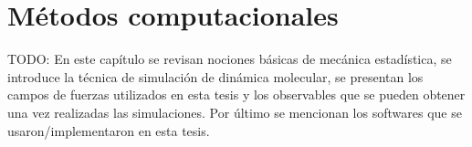 \chapter{Métodos computacionales}\label{ch:metodos}
\thispagestyle{empty}

\vspace{50pt}

\begin{adjustwidth}{50pt}{50pt}
    TODO: 
    En este capítulo se revisan nociones básicas de mecánica estadística, se 
    introduce la técnica de simulación de dinámica molecular, se presentan los 
    campos de fuerzas utilizados en esta tesis y los observables que se pueden 
    obtener una vez realizadas las simulaciones. Por último se mencionan los 
    softwares que se usaron/implementaron en esta tesis.
\end{adjustwidth}

\clearpage
\newpage
\thispagestyle{empty}
\mbox{}
\newpage














